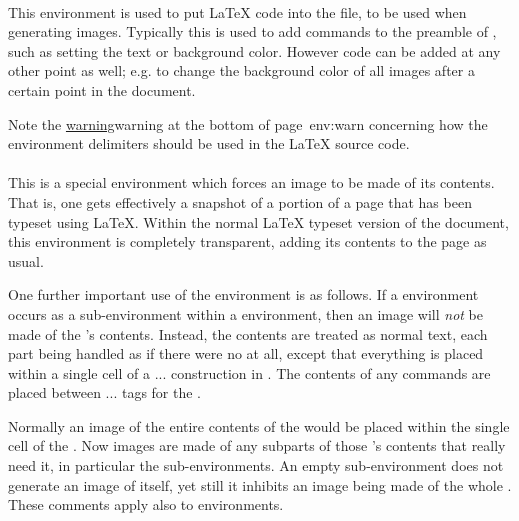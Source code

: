 \htmlrule[width=300]
%
%
\paragraph*{\label{imagesonly}}
This environment is used to put \LaTeX{} code into the  file,
to be used when generating images. Typically this is used to add commands to
the preamble of , such as setting the text or background color.
However code can be added at any other point as well; 
e.g. to change the background color of all images after a certain point in the document. 

\smallskip\noindent
Note the \hyperref[page]{warning}{warning at the bottom of page~}{}{env:warn}
concerning how the environment delimiters should be used in the
\LaTeX{} source code.


%
%
\paragraph*{\label{makeimage}}
This is a special environment which forces an image to be made of its contents.
That is, one gets effectively a snapshot of a portion of a page
that has been typeset using \LaTeX. 
Within the normal \LaTeX{} typeset version of the document, this environment 
is completely transparent, adding its contents to the page as usual.

\html{\\}%
One further important use of the  environment is as follows.
If a  environment occurs as a sub-environment within 
a  environment, then an image will \emph{not} be made of the
's contents. Instead, the contents are treated as normal text,
each part being handled as if there were no  at all,
except that everything is placed within a single cell of a
... construction in \HTMLiii. 
The contents of any 
commands are placed between ... tags 
for the .

\html{\\}%
Normally an image of the entire contents of the  would be
placed within the single cell of the .
Now images are made of any subparts of those 's contents 
that really need it, in particular the  sub-environments.
An empty  sub-environment does not generate an image of itself,
yet still it inhibits an image being made of the whole .
These comments apply also to  environments.




